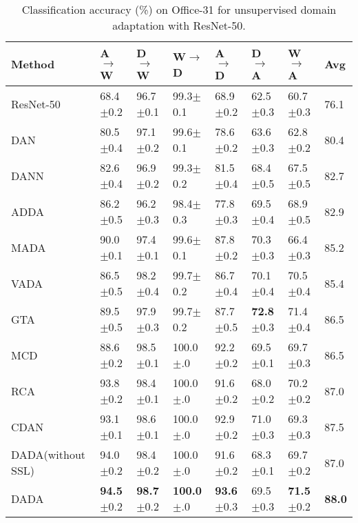 \documentclass{ecai}
\begin{document}
\begin{table*}[!htbp]
\centering
\caption{Classification accuracy (\%) on Office-31 for unsupervised domain adaptation with ResNet-50.}
\begin{tabular}{p{3.0cm}p{1.4cm}<{\centering}p{1.4cm}<{\centering}p{1.4cm}<{\centering}p{1.4cm}<{\centering}p{1.4cm}<{\centering}p{1.4cm}<{\centering}p{1.4cm}<{\centering}}
\toprule
Method&   A$\rightarrow$W&   D$\rightarrow$W&   W$\rightarrow$D&   A$\rightarrow$D&   D$\rightarrow$A&   W$\rightarrow$A&  Avg\\
\midrule
ResNet-50\cite{b36}&  68.4$\pm$0.2&   96.7$\pm$0.1&   99.3$\pm$0.1&   68.9$\pm$0.2&   62.5$\pm$0.3&   60.7$\pm$0.3&   76.1\\
DAN\cite{b9}&  80.5$\pm$0.4&   97.1$\pm$0.2&   99.6$\pm$0.1&   78.6$\pm$0.2&   63.6$\pm$0.3&   62.8$\pm$0.2&   80.4\\
DANN\cite{b18}& 82.6$\pm$0.4&   96.9$\pm$0.2&   99.3$\pm$0.2&   81.5$\pm$0.4&   68.4$\pm$0.5&   67.5$\pm$0.5&   82.7\\
ADDA\cite{b33}& 86.2$\pm$0.5&   96.2$\pm$0.3&   98.4$\pm$0.3&   77.8$\pm$0.3&   69.5$\pm$0.4&   68.9$\pm$0.5&   82.9\\
MADA\cite{b13}& 90.0$\pm$0.1&   97.4$\pm$0.1&   99.6$\pm$0.1&   87.8$\pm$0.2&   70.3$\pm$0.3&   66.4$\pm$0.3&   85.2\\
VADA\cite{b40}& 86.5$\pm$0.5&   98.2$\pm$0.4&   99.7$\pm$0.2&   86.7$\pm$0.4&   70.1$\pm$0.4&   70.5$\pm$0.4&   85.4\\
GTA\cite{b39}&  89.5$\pm$0.5&   97.9$\pm$0.3&   99.7$\pm$0.2&   87.7$\pm$0.5&   \textbf{72.8}$\pm$0.3&   71.4$\pm$0.4&   86.5\\
MCD\cite{b24}&  88.6$\pm$0.2&   98.5$\pm$0.1&   100.0$\pm$.0&   92.2$\pm$0.2&   69.5$\pm$0.1&   69.7$\pm$0.3&   86.5\\
RCA\cite{b17}&  93.8$\pm$0.2&   98.4$\pm$0.1&   100.0$\pm$.0&   91.6$\pm$0.2&   68.0$\pm$0.2&   70.2$\pm$0.2&   87.0\\
CDAN\cite{b34}& 93.1$\pm$0.1&   98.6$\pm$0.1&   100.0$\pm$.0&   92.9$\pm$0.2&   71.0$\pm$0.3&   69.3$\pm$0.3&   87.5\\
\midrule
DADA(without SSL)& 94.0$\pm$0.2&  98.4$\pm$0.2&  100.0$\pm$.0&   91.6$\pm$0.2&  68.3$\pm$0.1&   69.7$\pm$0.2&   87.0 \\
DADA&        \textbf{94.5}$\pm$0.2&   \textbf{98.7}$\pm$0.2&   \textbf{100.0}$\pm$.0&   \textbf{93.6}$\pm$0.3&   69.5$\pm$0.3&   \textbf{71.5}$\pm$0.2&   \textbf{88.0}\\
\bottomrule
\end{tabular}
\label{res_1}
\end{table*}
\end{document}

